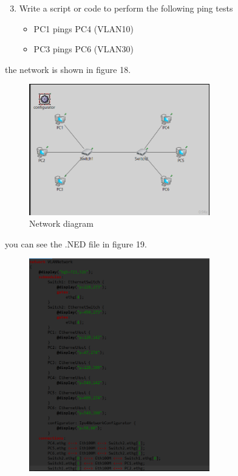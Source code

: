 \begin{enumerate}[label=\Roman*.]
    \setcounter{enumi}{2}
    \item Write a script or code to perform the following ping tests
    \begin{itemize}
        \item PC1 pings PC4 (VLAN10)
        \item PC3 pings PC6 (VLAN30)
    \end{itemize}
\end{enumerate}
\begin{qsolve}
    \begin{qsolve}[]
        the network is shown in figure 18.
        \begin{figure}[H]
            \centering
            \includegraphics[width=0.7\textwidth]{Q2_1network.png}
            \caption{Network diagram}
        \end{figure}
        \splitqsolve[\splitqsolve]
        you can see the .NED file in figure 19. 
        \begin{figure}[H]
            \centering
            \includegraphics[width=0.7\textwidth]{Q2_1ned.png}

\end{figure}
\end{qsolve}
\end{qsolve}
